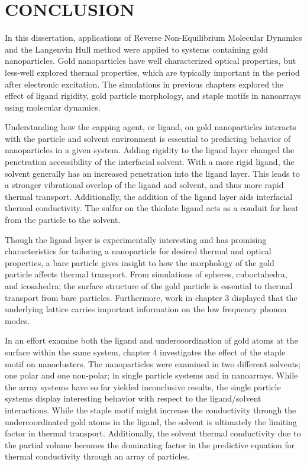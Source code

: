 \chapter{CONCLUSION}\label{chap:conclusion}
In this dissertation, applications of Reverse Non-Equilibrium Molecular Dynamics and the Langenvin Hull method were applied to systems containing gold nanoparticles. Gold nanoparticles have well characterized optical properties, but less-well explored thermal properties, which are typically important in the period after electronic excitation. The simulations in previous chapters explored the effect of ligand rigidity, gold particle morphology, and staple motifs in nanoarrays using molecular dynamics.

Understanding how the capping agent, or ligand, on gold nanoparticles interacts with the particle and solvent environment is essential to predicting behavior of nanoparticles in a given system. Adding rigidity to the ligand layer changed the penetration accessibility of the interfacial solvent. With a more rigid ligand, the solvent generally has an increased penetration into the ligand layer. This leads to a stronger vibrational overlap of the ligand and solvent, and thus more rapid thermal transport. Additionally, the addition of the ligand layer aids interfacial thermal conductivity. The sulfur on the thiolate ligand acts as a conduit for heat from the particle to the solvent.

Though the ligand layer is experimentally interesting and has promising characteristics for tailoring a nanoparticle for desired thermal and optical properties, a bare particle gives insight to how the morphology of the gold particle affects thermal transport.
From simulations of spheres, cuboctahedra, and icosahedra; the surface structure of the gold particle is essential to thermal transport from bare particles.
Furthermore, work in chapter 3 displayed that the underlying lattice carries important information on the low frequency phonon modes. 

In an effort examine both the ligand and undercoordination of gold atoms at the surface within the same system, chapter 4 investigates the effect of the staple motif on  nanoclusters.
The nanoparticles were examined in two different solvents; one polar and one non-polar; in single particle systems and in nanoarrays.
While the array systems have so far yielded inconclusive results, the single particle systems display interesting behavior with respect to the ligand/solvent interactions. 
While the staple motif might increase the conductivity through the undercoordinated gold atoms in the ligand, the solvent is ultimately the limiting factor in thermal transport. 
Additionally, the solvent thermal conductivity due to the partial volume becomes the dominating factor in the predictive equation for thermal conductivity through an array of  particles.

